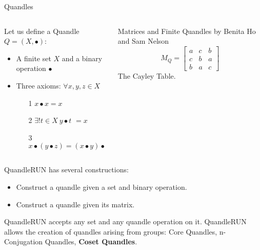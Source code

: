 \begin{frame}{Quandles}

\small

\begin{columns}
\begin{column}{0.6\textwidth}
 Let us define a Quandle $Q = (X, \bullet)$:
 \begin{itemize}
    \item A finite set $X$ and a binary operation $\bullet$
    \item Three axioms: $\forall x, y, z \in X$\begin{itemize}
        
        \item[1] $x \bullet  x = x$
        
        \item[2]   $\exists! t \in X~y \bullet t$ $= x$ 
        \item[3] $ 
        x \bullet (y \bullet z) = (x \bullet y) \bullet (x \bullet z) 
        $ 
    \end{itemize}
    
\end{itemize}
\end{column}
\vspace{1em}
\begin{column}{0.4\textwidth}  

\tiny Matrices and Finite Quandles by Benita Ho and Sam Nelson
\Large
\[M_Q = \begin{bmatrix}
a& c & b \\
c & b & a\\
b & a& c
\end{bmatrix}\]
\small The Cayley Table.
\end{column}
\end{columns}
QuandleRUN has several constructions:
\begin{itemize}
    \item Construct a quandle given a set and binary operation. 
    \item Construct a quandle given its matrix.
\end{itemize}
QuandleRUN accepts any set and any quandle operation on it. \newline 
\newline
QuandleRUN allows the creation of quandles arising from groups: Core Quandles, n-Conjugation Quandles, \textbf{Coset Quandles}.
\end{frame}



